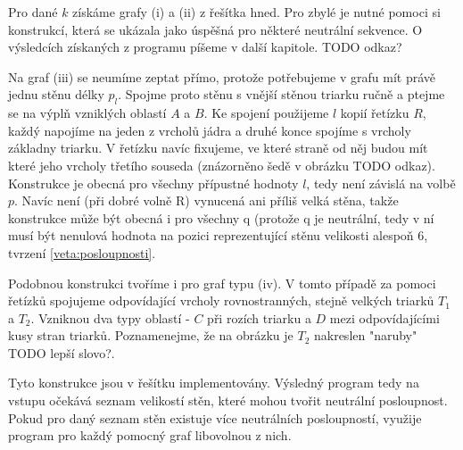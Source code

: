 Pro dané $k$ získáme grafy (i) a (ii) z řešítka hned. Pro zbylé je nutné pomoci si konstrukcí, která se ukázala jako úspěšná pro některé neutrální sekvence. O výsledcích získaných z programu píšeme v další kapitole. TODO odkaz?

Na graf (iii) se neumíme zeptat přímo, protože potřebujeme v grafu mít právě jednu stěnu délky $p_l$. Spojme proto stěnu s vnější stěnou triarku ručně a ptejme se na výplň vzniklých oblastí $A$ a $B$. Ke spojení použijeme $l$ kopií řetízku $R$, každý napojíme na jeden z vrcholů jádra a druhé konce spojíme s  vrcholy základny triarku. V řetízku navíc fixujeme, ve které straně od něj budou mít které jeho vrcholy třetího souseda (znázorněno šedě v obrázku TODO odkaz). Konstrukce je obecná pro všechny přípustné hodnoty $l$, tedy není závislá na volbě $p$. Navíc není (při dobré volně R) vynucená ani příliš velká stěna, takže konstrukce může být obecná i pro všechny q (protože q je neutrální, tedy v ní musí být nenulová hodnota na pozici reprezentující stěnu velikosti alespoň 6, tvrzení \eqref{veta:posloupnosti}.



Podobnou konstrukci tvoříme i pro graf typu (iv). V tomto případě za pomoci řetízků spojujeme odpovídající vrcholy rovnostranných, stejně velkých triarků $T_1$ a $T_2$. Vzniknou dva typy oblastí - $C$ při rozích triarku a $D$ mezi odpovídajícími kusy stran triarků. Poznamenejme, že na obrázku je $T_2$ nakreslen "naruby" TODO lepší slovo?. 

Tyto konstrukce jsou v řešítku implementovány. Výsledný program tedy na vstupu očekává seznam velikostí stěn, které mohou tvořit neutrální posloupnost. Pokud pro daný seznam stěn existuje více neutrálních posloupností, využije program pro každý pomocný graf libovolnou z nich.

